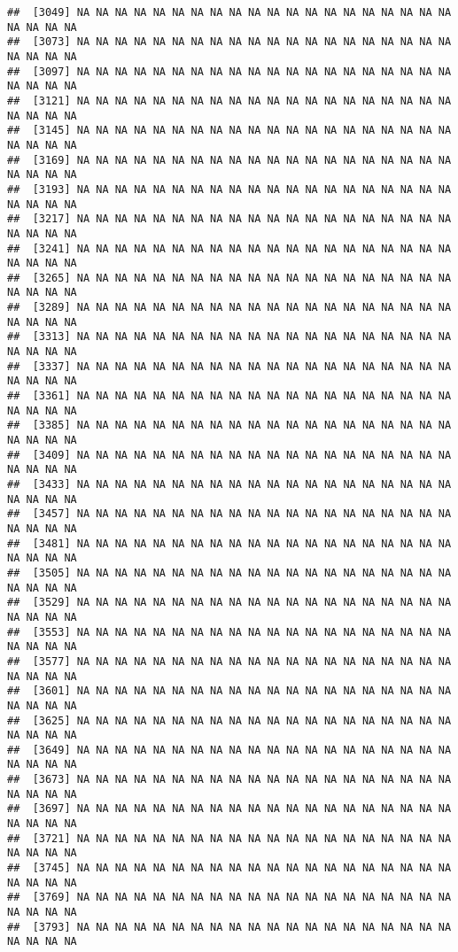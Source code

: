 \documentclass[
]{article}
\begin{document}
\begin{verbatim}
##  [3049] NA NA NA NA NA NA NA NA NA NA NA NA NA NA NA NA NA NA NA NA NA NA NA NA
##  [3073] NA NA NA NA NA NA NA NA NA NA NA NA NA NA NA NA NA NA NA NA NA NA NA NA
##  [3097] NA NA NA NA NA NA NA NA NA NA NA NA NA NA NA NA NA NA NA NA NA NA NA NA
##  [3121] NA NA NA NA NA NA NA NA NA NA NA NA NA NA NA NA NA NA NA NA NA NA NA NA
##  [3145] NA NA NA NA NA NA NA NA NA NA NA NA NA NA NA NA NA NA NA NA NA NA NA NA
##  [3169] NA NA NA NA NA NA NA NA NA NA NA NA NA NA NA NA NA NA NA NA NA NA NA NA
##  [3193] NA NA NA NA NA NA NA NA NA NA NA NA NA NA NA NA NA NA NA NA NA NA NA NA
##  [3217] NA NA NA NA NA NA NA NA NA NA NA NA NA NA NA NA NA NA NA NA NA NA NA NA
##  [3241] NA NA NA NA NA NA NA NA NA NA NA NA NA NA NA NA NA NA NA NA NA NA NA NA
##  [3265] NA NA NA NA NA NA NA NA NA NA NA NA NA NA NA NA NA NA NA NA NA NA NA NA
##  [3289] NA NA NA NA NA NA NA NA NA NA NA NA NA NA NA NA NA NA NA NA NA NA NA NA
##  [3313] NA NA NA NA NA NA NA NA NA NA NA NA NA NA NA NA NA NA NA NA NA NA NA NA
##  [3337] NA NA NA NA NA NA NA NA NA NA NA NA NA NA NA NA NA NA NA NA NA NA NA NA
##  [3361] NA NA NA NA NA NA NA NA NA NA NA NA NA NA NA NA NA NA NA NA NA NA NA NA
##  [3385] NA NA NA NA NA NA NA NA NA NA NA NA NA NA NA NA NA NA NA NA NA NA NA NA
##  [3409] NA NA NA NA NA NA NA NA NA NA NA NA NA NA NA NA NA NA NA NA NA NA NA NA
##  [3433] NA NA NA NA NA NA NA NA NA NA NA NA NA NA NA NA NA NA NA NA NA NA NA NA
##  [3457] NA NA NA NA NA NA NA NA NA NA NA NA NA NA NA NA NA NA NA NA NA NA NA NA
##  [3481] NA NA NA NA NA NA NA NA NA NA NA NA NA NA NA NA NA NA NA NA NA NA NA NA
##  [3505] NA NA NA NA NA NA NA NA NA NA NA NA NA NA NA NA NA NA NA NA NA NA NA NA
##  [3529] NA NA NA NA NA NA NA NA NA NA NA NA NA NA NA NA NA NA NA NA NA NA NA NA
##  [3553] NA NA NA NA NA NA NA NA NA NA NA NA NA NA NA NA NA NA NA NA NA NA NA NA
##  [3577] NA NA NA NA NA NA NA NA NA NA NA NA NA NA NA NA NA NA NA NA NA NA NA NA
##  [3601] NA NA NA NA NA NA NA NA NA NA NA NA NA NA NA NA NA NA NA NA NA NA NA NA
##  [3625] NA NA NA NA NA NA NA NA NA NA NA NA NA NA NA NA NA NA NA NA NA NA NA NA
##  [3649] NA NA NA NA NA NA NA NA NA NA NA NA NA NA NA NA NA NA NA NA NA NA NA NA
##  [3673] NA NA NA NA NA NA NA NA NA NA NA NA NA NA NA NA NA NA NA NA NA NA NA NA
##  [3697] NA NA NA NA NA NA NA NA NA NA NA NA NA NA NA NA NA NA NA NA NA NA NA NA
##  [3721] NA NA NA NA NA NA NA NA NA NA NA NA NA NA NA NA NA NA NA NA NA NA NA NA
##  [3745] NA NA NA NA NA NA NA NA NA NA NA NA NA NA NA NA NA NA NA NA NA NA NA NA
##  [3769] NA NA NA NA NA NA NA NA NA NA NA NA NA NA NA NA NA NA NA NA NA NA NA NA
##  [3793] NA NA NA NA NA NA NA NA NA NA NA NA NA NA NA NA NA NA NA NA NA NA NA NA

\end{verbatim}
\end{document}
